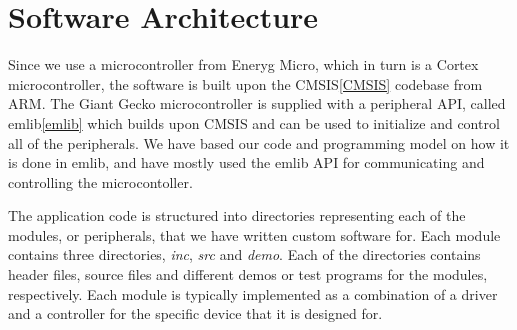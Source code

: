 \section{Software Architecture}

Since we use a microcontroller from Eneryg Micro, which in turn
is a Cortex microcontroller, the software is built upon the
CMSIS\ref{CMSIS} codebase from ARM. The Giant Gecko
microcontroller is supplied with a peripheral API, called
emlib\ref{emlib} which builds upon CMSIS and can be used to
initialize and control all of the peripherals. We have based our
code and programming model on how it is done in emlib, and have
mostly used the emlib API for communicating and controlling the
microcontoller. 

The application code is structured into directories representing
each of the modules, or peripherals, that we have written custom
software for. Each module contains three directories,
\textit{inc}, \textit{src} and \textit{demo}. Each of the
directories contains header files, source files and different
demos or test programs for the modules, respectively. Each
module is typically implemented as a combination of a driver and
a controller for the specific device that it is designed for.
